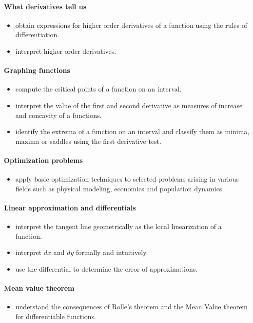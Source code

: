 \documentclass{amsart}
\begin{document}
\paragraph*{What derivatives tell us}
\begin{itemize}
\item obtain expressions for higher order derivatives of a function using the rules of
 differentiation.
\item interpret higher order derivatives. 
\end{itemize}


\paragraph*{Graphing functions}
\begin{itemize}
\item compute the critical points of a function on an interval.
\item interpret the value of the first and second derivative as
  measures of increase and concavity of a functions.
\item identify the extrema of a function on an interval and classify them as
 minima, maxima or saddles using the first derivative test.
\end{itemize}


\paragraph*{Optimization problems}
\begin{itemize}
\item apply basic optimization techniques to selected problems arising
  in various fields such as physical modeling, economics and
  population dynamics.
\end{itemize}

\paragraph*{Linear approximation and differentials}
\begin{itemize}
\item interpret the tangent line geometrically as the local linearization of a function.
\item interpret $dx$ and $dy$ formally and intuitively.
\item use the differential to determine the error of approximations.
\end{itemize}

\paragraph*{Mean value theorem}
\begin{itemize}
\item understand the consequences of Rolle's theorem and the Mean
  Value theorem for differentiable functions.
\end{itemize}
\end{document}
